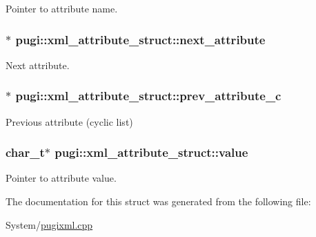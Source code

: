 Pointer to attribute name. 

\hypertarget{structpugi_1_1xml__attribute__struct_a9860c0eb7fa72dc9b69ee9b0575f9efc}{
\subsubsection[{next\-\_\-attribute}]{$\ast$ pugi\-::xml\-\_\-attribute\-\_\-struct\-::next\-\_\-attribute}}\label{structpugi_1_1xml__attribute__struct_a9860c0eb7fa72dc9b69ee9b0575f9efc}


Next attribute. 

\hypertarget{structpugi_1_1xml__attribute__struct_a0e3a022235b316e4cfc1034ceb7d7862}{
\subsubsection[{prev\-\_\-attribute\-\_\-c}]{$\ast$ pugi\-::xml\-\_\-attribute\-\_\-struct\-::prev\-\_\-attribute\-\_\-c}}\label{structpugi_1_1xml__attribute__struct_a0e3a022235b316e4cfc1034ceb7d7862}


Previous attribute (cyclic list) 

\hypertarget{structpugi_1_1xml__attribute__struct_ae652627d56cb9dcc0afdd1fbf6570364}{
\subsubsection[{value}]{\setlength{\rightskip}{0pt plus 5cm}char\-\_\-t$\ast$ pugi\-::xml\-\_\-attribute\-\_\-struct\-::value}}\label{structpugi_1_1xml__attribute__struct_ae652627d56cb9dcc0afdd1fbf6570364}


Pointer to attribute value. 



The documentation for this struct was generated from the following file\-:\begin{DoxyCompactItemize}
\item 
System/\hyperlink{pugixml_8cpp}{pugixml.\-cpp}\end{DoxyCompactItemize}
